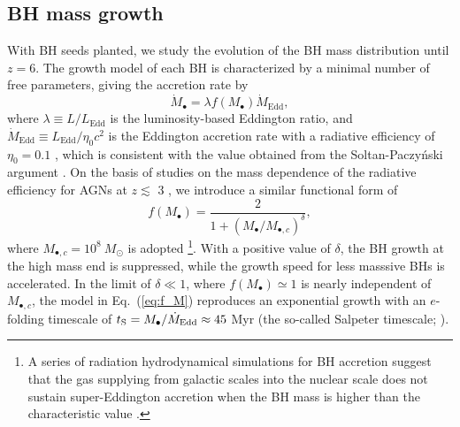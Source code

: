 \documentclass[twocolumn, twocolappendix]{aastex63}
\newcommand{\Msun}{M_\odot}
\newcommand{\Mbh}{M_\bullet}
\newcommand{\Mdot}{\dot{M}}
\begin{document}
\begin{CJK*}{UTF8}{gbsn}
\vspace{2mm}
\subsection{BH mass growth}
\label{sec:model}
With BH seeds planted, we study the evolution of the BH mass distribution until $z=6$. 
The growth model of each BH is characterized by a minimal number of free parameters, 
giving the accretion rate by
%
\begin{equation}
  \label{eq:mdot}
  \Mdot_\bullet = \lambda f(\Mbh) \Mdot_\mathrm{Edd} ,
\end{equation}
where $\lambda \equiv L/L_\mathrm{Edd}$ is the luminosity-based Eddington ratio,
and $\Mdot_\mathrm{Edd} \equiv L_{\mathrm{Edd}}/\eta_0 c^2$ is the Eddington accretion rate with a radiative efficiency of $\eta_0=0.1$ \citep{1973A&A....24..337S},
which is consistent with the value obtained from the Soltan-Paczy{\'n}ski argument \citep[e.g.,][]{2002MNRAS.335..965Y,2010ApJ...725..388C}.
On the basis of studies on the mass dependence of the radiative efficiency for AGNs at $z\lesssim$ 3 
\citep{2008MNRAS.390..561C,2012ApJ...749..187L,2014ApJ...786..104U}, 
we introduce a similar functional form of
%
\begin{equation}
\label{eq:f_M}
f(\Mbh) = \frac{2}{1+\left(\Mbh /M_{\bullet,c} \right)^\delta}, 
\end{equation}
%
where $M_{\bullet,c}=10^8~\Msun$ is adopted
\footnote[3]{
A series of radiation hydrodynamical simulations for BH accretion
suggest that the gas supplying from galactic scales into the nuclear scale does not sustain 
super-Eddington accretion when the BH mass is higher than the characteristic value \citep{2021ApJ...907...74T}.}.
With a positive value of $\delta$, the BH growth at the high mass end is suppressed,
while the growth speed for less masssive BHs is accelerated.
In the limit of $\delta \ll 1$, where $f(\Mbh) \simeq 1$ is nearly independent of $M_{\bullet,c}$,
the model in Eq.~(\ref{eq:f_M}) reproduces an exponential growth with an $e$-folding timescale of
$t_{\rm S} =  \Mbh/\Mdot_{\mathrm{Edd}} \approx 45$ Myr (the so-called Salpeter timescale; \citealt{1964ApJ...140..796S}).




\end{CJK*}
\end{document}
